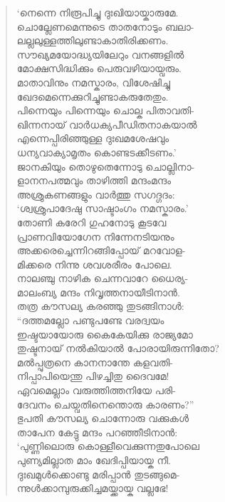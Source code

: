 \begin{verse}
‘നെന്നെ നിരൂപിച്ചു ദുഃഖിയായ്കാരുമേ.\\
ചൊല്ലേണമെന്നുടെ താതനോടും ബലാ-\\
ലല്ലലുള്ളത്തിലുണ്ടാകാതിരിക്കണം.\\
സൗഖ്യമയോദ്ധ്യയിലേറും വനങ്ങളില്‍\\
മോക്ഷസിദ്ധിക്കും പെരുവഴിയായ്വരും.\\
മാതാവിനും നമസ്കാരം, വിശേഷിച്ചു\\
ഖേദമെന്നെക്കുറിച്ചുണ്ടാകരുതേതും.\\
പിന്നെയും പിന്നെയും ചൊല്ക പിതാവതി-\\
ഖിന്നനായ് വാര്‍ധക്യപീഡിതനാകയാല്‍\\
എന്നെപ്പിരിഞ്ഞുള്ള ദുഃഖമശേഷവും\\
ധന്യവാക്യാമൃതം കൊണ്ടടക്കീടണം.’\\
ജാനകിയും തൊഴുതെന്നോടു ചൊല്ലിനാ-\\
ളാനനപത്മവും താഴിത്തി മന്ദംമന്ദം\\
അശ്രുകണങ്ങളും വാര്‍ത്തു സഗദ്ഗദം:\\
‘ശ്വശ്രുപാദേഷു സാഷ്ടാംഗം നമസ്കാരം.’\\
തോണി കരേറി ഗുഹനോടു കൂടവേ\\
പ്രാണവിയോഗേന നിന്നേനടിയനും\\
അക്കരെച്ചെന്നിറങ്ങിപ്പോയ് മറവോള-\\
മിക്കരെ നിന്നു ശവശരീരം പോലെ.\\
നാലഞ്ചു നാഴിക ചെന്നവാറേ ധൈര്യ-\\
മാലംബ്യ മന്ദം നിവൃത്തനായീടിനാന്‍.\\
തത്ര കൗസല്യ കരഞ്ഞു തുടങ്ങിനാള്‍:\\
“ദത്തമല്ലോ പണ്ടുപണ്ടേ വരദ്വയം\\
ഇഷ്ടയായോരു കൈകേയിക്കു രാജ്യമോ\\
തുഷ്ടനായ് നല്‍കിയാല്‍ പോരായിരുന്നിതോ?\\
മല്‍പ്പുത്രനെ കാനനാന്തേ കളവതി-\\
നിപ്പാപിയെന്തു പിഴച്ചിതു ദൈവമേ!\\
ഏവമെല്ലാം വരുത്തിത്തനിയേ പരി-\\
ദേവനം ചെയ്വതിനെന്തൊരു കാരണം?”\\
ഭുപതി കൗസല്യ ചൊന്നോരു വക്കുകള്‍\\
താപേന കേട്ടു മന്ദം പറഞ്ഞീടിനാന്‍:\\
‘പുണ്ണിലൊരു കൊള്ളീവെക്കുന്നതുപോലെ\\
പുണ്യമില്ലാത മാം ഖേദിപ്പിയായ്ക നീ.\\
ദുഃഖമുള്‍ക്കൊണ്ടു മരിപ്പാന്‍ തുടങ്ങുമെ-\\
ന്നുള്‍ക്കാമ്പുരുക്കിച്ചമയ്ക്കായ്ക വല്ലഭേ!\\

\end{verse}
